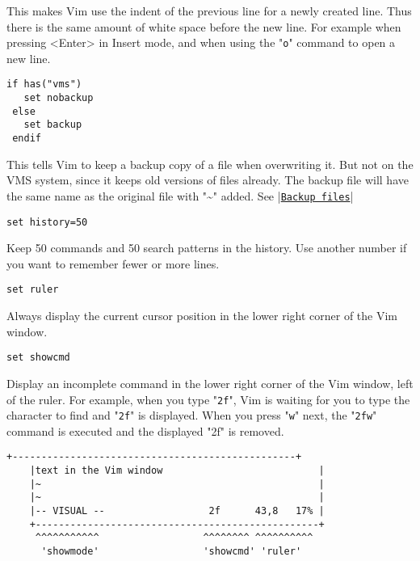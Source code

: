 This makes Vim use the indent of the previous line for a newly created line.
Thus there is the same amount of white space before the new line.
For example when pressing <Enter> in Insert mode, and when using the "\texttt{o}" command to open a new line.

 \begin{Verbatim}[samepage=true]
 if has("vms")
   set nobackup
 else
   set backup
 endif
 \end{Verbatim}

This tells Vim to keep a backup copy of a file when overwriting it.
But not on the VMS system, since it keeps old versions of files already.
The backup file will have the same name as the original file with "\textasciitilde" added.
See |\hyperref[Backup files]{\texttt{Backup files}}|

 \begin{Verbatim}[samepage=true]
 set history=50
 \end{Verbatim}

Keep 50 commands and 50 search patterns in the history.
Use another number if you want to remember fewer or more lines.

 \begin{Verbatim}[samepage=true]
 set ruler
 \end{Verbatim}

Always display the current cursor position in the lower right corner of the Vim window.

 \begin{Verbatim}[samepage=true]
 set showcmd
 \end{Verbatim}

Display an incomplete command in the lower right corner of the Vim window, left of the ruler.
For example, when you type "\texttt{2f}", Vim is waiting for you to type the character to find and "\texttt{2f}" is displayed.
When you press "\texttt{w}" next, the "\texttt{2fw}" command is executed and the displayed "2f" is removed.

\begin{Verbatim}[samepage=true]
    +-------------------------------------------------+
    |text in the Vim window                           |
    |~                                                |
    |~                                                |
    |-- VISUAL --                  2f      43,8   17% |
    +-------------------------------------------------+
     ^^^^^^^^^^^                  ^^^^^^^^ ^^^^^^^^^^
      'showmode'                  'showcmd' 'ruler'
\end{Verbatim}

